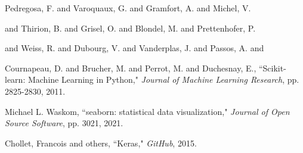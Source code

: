 \documentclass[12pt]{article}
\begin{document}
\begin{thebibliography}{100}
	
	
	 Pedregosa, F. and Varoquaux, G. and Gramfort, A. and Michel, V.

	and Thirion, B. and Grisel, O. and Blondel, M. and Prettenhofer, P.

	and Weiss, R. and Dubourg, V. and Vanderplas, J. and Passos, A. and

	Cournapeau, D. and Brucher, M. and Perrot, M. and Duchesnay, E., ``Scikit-learn: Machine Learning in {P}ython," \emph{Journal of Machine Learning Research}, pp. 2825-2830, 2011.

	
	
	 Michael L. Waskom, ``seaborn: statistical data visualization," \emph{Journal of Open Source Software}, pp. 3021, 2021.

	
	
	 Chollet, Francois and others, ``Keras," \emph{GitHub}, 2015.

	
	
	\end{thebibliography}
	
\end{document}
